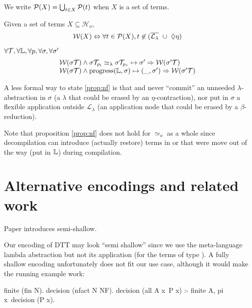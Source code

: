 \documentclass[sigconf,natbib=false,review]{acmart}
\newcommand{\UnifRel}{\ensuremath{\simeq}}
\newcommand{\Uo}{\ensuremath{\UnifRel_o}\xspace}
\newcommand{\Ue}{\ensuremath{\UnifRel_\lambda}\xspace}
\newcommand{\llambda}{\ensuremath{\mathcal{L}_\lambda}\xspace}
\newcommand{\Ho}{\ensuremath{\mathcal{H}_o}\xspace}
\begin{document}
\noindent
We write $\mathcal{P}(X) = \bigcup_{t\in X} \mathcal{P}(t)$ when $X$ is a set of terms.

\newcommand{\wellb}{\ensuremath{\mathcal{W}}\xspace}
\begin{definition}
Given a set of terms $X \subseteq \Ho{}$,
$$
\wellb(X) \Leftrightarrow \forall t \in \subterm{X}, t \not\in (\maybebeta{} ~\cup~ \maybeeta{})
$$
\end{definition}

\noindent

\begin{proposition}[\wellb{}-preservation]\label{prop:nf}
$\forall \mathcal{T}, \forall \mathbb{L}, \forall p, \forall \sigma, \forall \sigma'$
$$
\begin{array}{l}
\wellb(\sigma\mathcal{T}) \land
  \sigma\mathcal{T}_{p_l} \Ue \sigma\mathcal{T}_{p_r} \mapsto {\sigma'}
  \Rightarrow \wellb(\sigma' \mathcal{T})\\
\wellb(\sigma\mathcal{T}) \land
  \progress(\linkStore,\sigma) \mapsto (\_,\sigma')
  \Rightarrow \wellb(\sigma' \mathcal{T})
\end{array}
$$
\end{proposition}

\noindent
A less formal way to state \ref{prop:nf} is that \hstep{} and \progress never
``commit'' an unneeded $\lambda$-abstraction in $\sigma$ (a $\lambda$
that could be erased by an $\eta$-contraction),
nor put in $\sigma$ a flexible application outside \llambda{}
(an application node that could be erased by a $\beta$-reduction).

Note that proposition \ref{prop:nf} does not hold for \Uo{} as a whole
since decompilation can introduce (actually restore) terms in
\maybeeta or \maybebeta that were move out of the way
(put in $\mathbb{L}$) during compilation.

\section{Alternative encodings and related work}

Paper \cite{10.1145/2966268.2966272} introduces semi-shallow.

Our encoding of DTT may look ``semi shallow'' since we use the meta-language
lambda abstraction but not its application (for the terms of type ).
A fully shallow encoding unfortunately does not fit our use case, although
it would make the running example work:

\begin{elpicode}
finite (fin N).
decision (nfact N NF).
decision (all A x\ P x) :- finite A, pi x\ decision (P x).
\end{elpicode}
\end{document}
